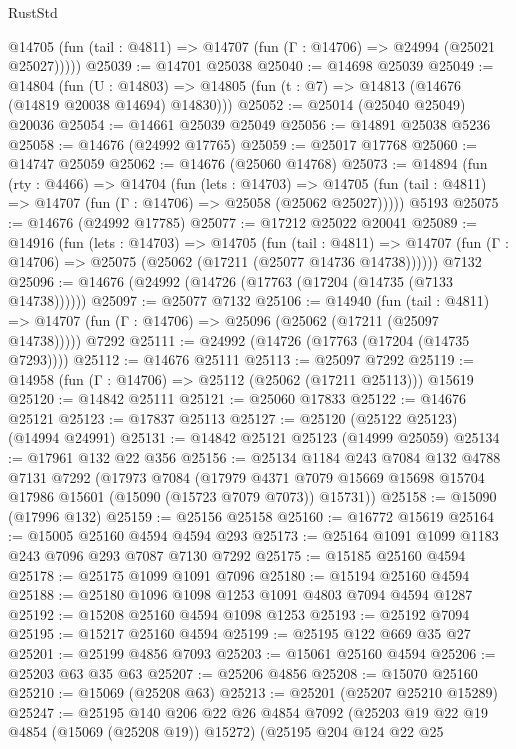 \begin{lexlean}{RustStd}
\begin{coremodule}
      @14705 (fun (tail : @4811) => @14707 (fun (Γ : @14706) => @24994 (@25021 @25027)))))
@25039 := @14701 @25038
@25040 := @14698 @25039
@25049 := @14804
    (fun (U : @14803) => @14805 (fun (t : @7) => @14813 (@14676 (@14819 @20038 @14694) @14830)))
@25052 := @25014 (@25040 @25049) @20036
@25054 := @14661 @25039 @25049
@25056 := @14891 @25038 @5236
@25058 := @14676 (@24992 @17765)
@25059 := @25017 @17768
@25060 := @14747 @25059
@25062 := @14676 (@25060 @14768)
@25073 := @14894
    (fun (rty : @4466) =>
    @14704
      (fun (lets : @14703) =>
      @14705 (fun (tail : @4811) => @14707 (fun (Γ : @14706) => @25058 (@25062 @25027)))))
    @5193
@25075 := @14676 (@24992 @17785)
@25077 := @17212 @25022 @20041
@25089 := @14916
    (fun (lets : @14703) =>
    @14705
      (fun (tail : @4811) =>
      @14707 (fun (Γ : @14706) => @25075 (@25062 (@17211 (@25077 @14736 @14738))))))
    @7132
@25096 := @14676 (@24992 (@14726 (@17763 (@17204 (@14735 (@7133 @14738))))))
@25097 := @25077 @7132
@25106 := @14940
    (fun (tail : @4811) => @14707 (fun (Γ : @14706) => @25096 (@25062 (@17211 (@25097 @14738)))))
    @7292
@25111 := @24992 (@14726 (@17763 (@17204 (@14735 @7293))))
@25112 := @14676 @25111
@25113 := @25097 @7292
@25119 := @14958 (fun (Γ : @14706) => @25112 (@25062 (@17211 @25113))) @15619
@25120 := @14842 @25111
@25121 := @25060 @17833
@25122 := @14676 @25121
@25123 := @17837 @25113
@25127 := @25120 (@25122 @25123) (@14994 @24991)
@25131 := @14842 @25121 @25123 (@14999 @25059)
@25134 := @17961 @132 @22 @356
@25156 := @25134
    @1184
    @243
    @7084
    @132
    @4788
    @7131
    @7292
    (@17973
      @7084
      (@17979 @4371 @7079 @15669 @15698 @15704 @17986 @15601 (@15090 (@15723 @7079 @7073)) @15731))
@25158 := @15090 (@17996 @132)
@25159 := @25156 @25158
@25160 := @16772 @15619
@25164 := @15005 @25160 @4594 @4594 @293
@25173 := @25164 @1091 @1099 @1183 @243 @7096 @293 @7087 @7130 @7292
@25175 := @15185 @25160 @4594
@25178 := @25175 @1099 @1091 @7096
@25180 := @15194 @25160 @4594
@25188 := @25180 @1096 @1098 @1253 @1091 @4803 @7094 @4594 @1287
@25192 := @15208 @25160 @4594 @1098 @1253
@25193 := @25192 @7094
@25195 := @15217 @25160 @4594
@25199 := @25195 @122 @669 @35 @27
@25201 := @25199 @4856 @7093
@25203 := @15061 @25160 @4594
@25206 := @25203 @63 @35 @63
@25207 := @25206 @4856
@25208 := @15070 @25160
@25210 := @15069 (@25208 @63)
@25213 := @25201 (@25207 @25210 @15289)
@25247 := @25195
    @140
    @206
    @22
    @26
    @4854
    @7092
    (@25203 @19 @22 @19 @4854 (@15069 (@25208 @19)) @15272)
    (@25195
      @204
      @124
      @22
      @25

\end{coremodule}
\end{lexlean}
